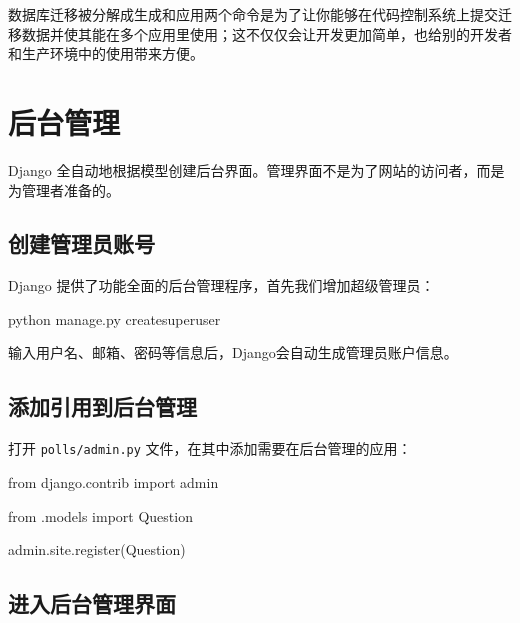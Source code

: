 \documentclass[]{ctexbook}
\newenvironment{Shaded}{\begin{snugshade}}{\end{snugshade}}
\newcommand{\ExtensionTok}[1]{#1}
\newcommand{\ImportTok}[1]{#1}
\newcommand{\NormalTok}[1]{#1}
\begin{document}
数据库迁移被分解成生成和应用两个命令是为了让你能够在代码控制系统上提交迁移数据并使其能在多个应用里使用；这不仅仅会让开发更加简单，也给别的开发者和生产环境中的使用带来方便。

\hypertarget{ux540eux53f0ux7ba1ux7406}{%
\section{后台管理}\label{ux540eux53f0ux7ba1ux7406}}

Django 全自动地根据模型创建后台界面。管理界面不是为了网站的访问者，而是为管理者准备的。

\hypertarget{ux521bux5efaux7ba1ux7406ux5458ux8d26ux53f7}{%
\subsection{创建管理员账号}\label{ux521bux5efaux7ba1ux7406ux5458ux8d26ux53f7}}

Django 提供了功能全面的后台管理程序，首先我们增加超级管理员：

\begin{Shaded}
\begin{Highlighting}[]
\ExtensionTok{python}\NormalTok{ manage.py createsuperuser}
\end{Highlighting}
\end{Shaded}

输入用户名、邮箱、密码等信息后，Django会自动生成管理员账户信息。

\hypertarget{ux6dfbux52a0ux5f15ux7528ux5230ux540eux53f0ux7ba1ux7406}{%
\subsection{添加引用到后台管理}\label{ux6dfbux52a0ux5f15ux7528ux5230ux540eux53f0ux7ba1ux7406}}

打开 \texttt{polls/admin.py} 文件，在其中添加需要在后台管理的应用：

\begin{Shaded}
\begin{Highlighting}[]
\ImportTok{from}\NormalTok{ django.contrib }\ImportTok{import}\NormalTok{ admin}

\ImportTok{from}\NormalTok{ .models }\ImportTok{import}\NormalTok{ Question}

\NormalTok{admin.site.register(Question)}
\end{Highlighting}
\end{Shaded}

\hypertarget{ux8fdbux5165ux540eux53f0ux7ba1ux7406ux754cux9762}{%
\subsection{进入后台管理界面}\label{ux8fdbux5165ux540eux53f0ux7ba1ux7406ux754cux9762}}
\end{document}
